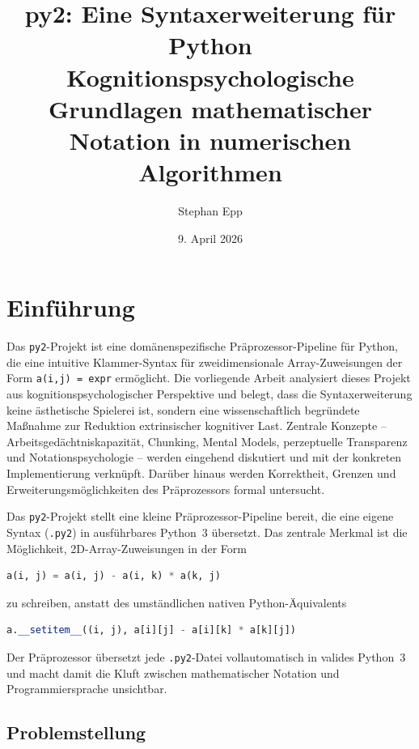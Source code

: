\documentclass[a4paper,12pt]{article}
\title{\textbf{py2: Eine Syntaxerweiterung f\"ur Python}\\
\large Kognitionspsychologische Grundlagen mathematischer\\
Notation in numerischen Algorithmen}
\author{Stephan Epp}
\date{9. April 2026}
\theoremstyle{definition}
\begin{document}
\maketitle
\tableofcontents
\newpage

\section{Einf\"uhrung}
Das \texttt{py2}-Projekt ist eine dom\"anenspezifische Pr\"aprozessor-Pipeline f\"ur Python,
die eine intuitive Klammer-Syntax f\"ur zweidimensionale Array-Zuweisungen der Form
\texttt{a(i,j) = expr} erm\"oglicht. Die vorliegende Arbeit analysiert dieses Projekt
aus kognitionspsychologischer Perspektive und belegt, dass die Syntaxerweiterung keine
\"asthetische Spielerei ist, sondern eine wissenschaftlich begr\"undete Ma\ss{}nahme zur
Reduktion extrinsischer kognitiver Last. Zentrale Konzepte -- Arbeitsged\"achtniskapazit\"at,
Chunking, Mental Models, perzeptuelle Transparenz und Notationspsychologie -- werden
eingehend diskutiert und mit der konkreten Implementierung verkn\"upft. Dar\"uber hinaus
werden Korrektheit, Grenzen und Erweiterungsm\"oglichkeiten des Pr\"aprozessors formal
untersucht.

Das \texttt{py2}-Projekt stellt eine kleine Pr\"aprozessor-Pipeline bereit, die eine
eigene Syntax (\texttt{.py2}) in ausf\"uhrbares Python~3 \"ubersetzt. Das zentrale
Merkmal ist die M\"oglichkeit, 2D-Array-Zuweisungen in der Form

\begin{lstlisting}[language=Python, caption={py2-Syntax: mathematisch-nat\"urliche Schreibweise}]
a(i, j) = a(i, j) - a(i, k) * a(k, j)
\end{lstlisting}

zu schreiben, anstatt des umst\"andlichen nativen Python-\"Aquivalents

\begin{lstlisting}[language=Python, caption={Natives Python: strukturell fremd f\"ur Mathematiker}]
a.__setitem__((i, j), a[i][j] - a[i][k] * a[k][j])
\end{lstlisting}

Der Pr\"aprozessor \"ubersetzt jede \texttt{.py2}-Datei vollautomatisch in valides Python~3
und macht damit die Kluft zwischen mathematischer Notation und Programmiersprache unsichtbar.

\subsection{Problemstellung}
\end{document}
